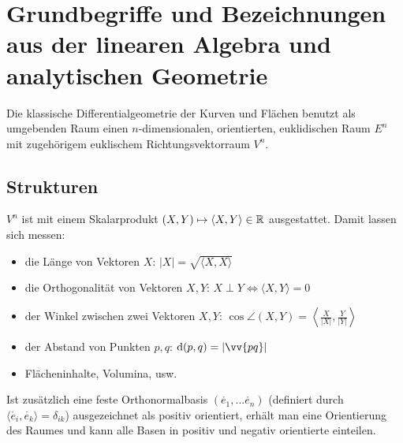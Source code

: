 \chapter{Grundbegriffe und Bezeichnungen aus der linearen Algebra und analytischen Geometrie}
  
  Die klassische Differentialgeometrie der Kurven und Flächen benutzt als umgebenden Raum einen \(n\)-dimensionalen, orientierten, euklidischen Raum \(E^n\) mit zugehörigem euklischem Richtungsvektorraum \(V^n\).

\section{Strukturen}

  \(V^n\) ist mit einem Skalarprodukt \((X,Y) \mapsto \langle X, Y \rangle \in \mathbb{R}\) ausgestattet. 
  Damit lassen sich messen:
  \begin{itemize}
   \item die Länge von Vektoren \(X\): \(|X| = \sqrt{ \langle X,X \rangle }\)
   \item die Orthogonalität von Vektoren \(X, Y\): \(X \perp Y \Leftrightarrow \langle X, Y \rangle = 0\)
   \item der Winkel zwischen zwei Vektoren \(X, Y\): \(\cos \angle (X, Y) = \left\langle \frac{X}{|X|}, \frac{Y}{|Y|} \right\rangle \)
   \item der Abstand von Punkten \(p, q\): \(\dist(p,q) = | \vv{pq} | \)
   \item Flächeninhalte, Volumina, usw.
  \end{itemize}
  Ist zusätzlich eine feste Orthonormalbasis \( (\mathring{e_1}, ... \mathring{e_n}) \) (definiert durch \( \langle \mathring{e_i}, \mathring{e_k} \rangle = \delta_{ik} \)) ausgezeichnet als positiv orientiert, erhält man eine Orientierung des Raumes und kann alle Basen in positiv und negativ orientierte einteilen.
  
